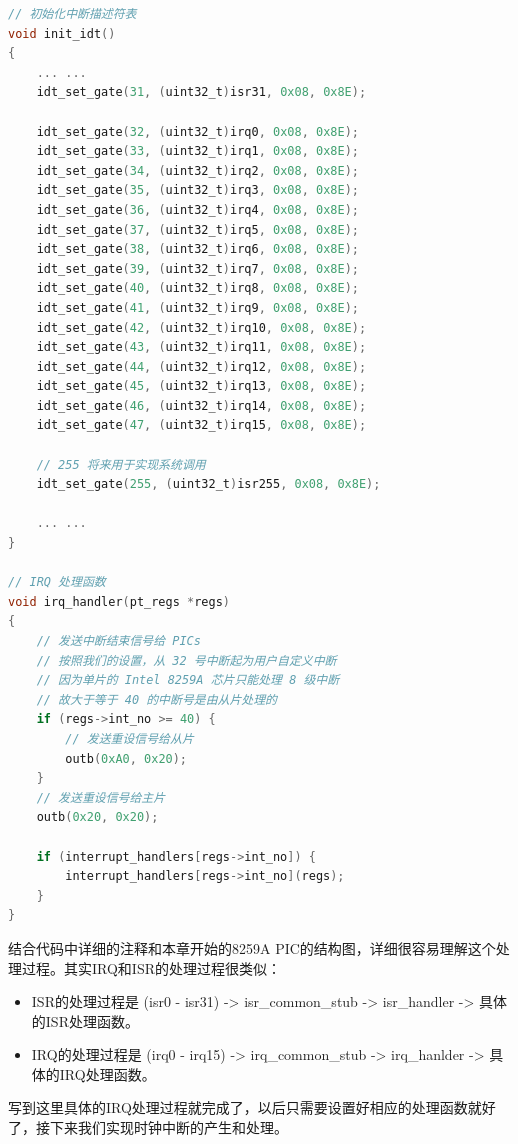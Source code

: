 \begin{lstlisting}[language = C, caption = idt/idt.c]
// 初始化中断描述符表
void init_idt()
{	
	... ...
	idt_set_gate(31, (uint32_t)isr31, 0x08, 0x8E);

	idt_set_gate(32, (uint32_t)irq0, 0x08, 0x8E);
	idt_set_gate(33, (uint32_t)irq1, 0x08, 0x8E);
	idt_set_gate(34, (uint32_t)irq2, 0x08, 0x8E);
	idt_set_gate(35, (uint32_t)irq3, 0x08, 0x8E);
	idt_set_gate(36, (uint32_t)irq4, 0x08, 0x8E);
	idt_set_gate(37, (uint32_t)irq5, 0x08, 0x8E);
	idt_set_gate(38, (uint32_t)irq6, 0x08, 0x8E);
	idt_set_gate(39, (uint32_t)irq7, 0x08, 0x8E);
	idt_set_gate(40, (uint32_t)irq8, 0x08, 0x8E);
	idt_set_gate(41, (uint32_t)irq9, 0x08, 0x8E);
	idt_set_gate(42, (uint32_t)irq10, 0x08, 0x8E);
	idt_set_gate(43, (uint32_t)irq11, 0x08, 0x8E);
	idt_set_gate(44, (uint32_t)irq12, 0x08, 0x8E);
	idt_set_gate(45, (uint32_t)irq13, 0x08, 0x8E);
	idt_set_gate(46, (uint32_t)irq14, 0x08, 0x8E);
	idt_set_gate(47, (uint32_t)irq15, 0x08, 0x8E);

	// 255 将来用于实现系统调用
	idt_set_gate(255, (uint32_t)isr255, 0x08, 0x8E);

	... ...
}

// IRQ 处理函数
void irq_handler(pt_regs *regs)
{
	// 发送中断结束信号给 PICs
	// 按照我们的设置，从 32 号中断起为用户自定义中断
	// 因为单片的 Intel 8259A 芯片只能处理 8 级中断
	// 故大于等于 40 的中断号是由从片处理的
	if (regs->int_no >= 40) {
		// 发送重设信号给从片
		outb(0xA0, 0x20);
	}
	// 发送重设信号给主片
	outb(0x20, 0x20);

	if (interrupt_handlers[regs->int_no]) {
		interrupt_handlers[regs->int_no](regs);
	}
}
\end{lstlisting}

\par 结合代码中详细的注释和本章开始的8259A PIC的结构图，详细很容易理解这个处理过程。其实IRQ和ISR的处理过程很类似：
\begin{mdframed}
	\begin{itemize}
		\item ISR的处理过程是 (isr0 - isr31) -> isr\_common\_stub -> isr\_handler -> 具体的ISR处理函数。
		\item IRQ的处理过程是 (irq0 - irq15) -> irq\_common\_stub -> irq\_hanlder -> 具体的IRQ处理函数。
	\end{itemize}
\end{mdframed}

\par 写到这里具体的IRQ处理过程就完成了，以后只需要设置好相应的处理函数就好了，接下来我们实现时钟中断的产生和处理。

